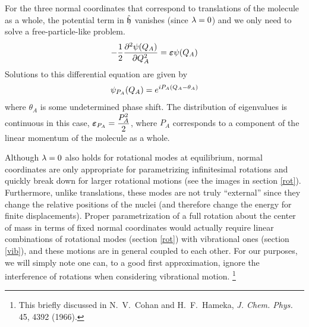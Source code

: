 \documentclass[11pt]{article}
\begin{document}
For the three normal coordinates that correspond to translations of the molecule as a whole, the potential term in $\hat{\mathfrak{h}}$ vanishes (since $\lambda=0$) and we only need to solve a free-particle-like problem.
\begin{align}
-\dfrac{1}{2}
	 \dfrac{ \partial^{2} \psi(Q_A) }{\partial Q_A ^{2}}
=
	\bm\varepsilon
	\psi(Q_A)
\end{align}
Solutions to this differential equation are given by
\begin{align}
	\psi_{P_A}(Q_A)
=
	e^{iP_A(Q_A-\theta_A)}
\end{align}
where $\theta_A$ is some undetermined phase shift.
The distribution of eigenvalues is continuous in this case, $\bm\varepsilon_{P_A}=\dfrac{P_A^2}{2}$, where $P_A$ corresponds to a component of the linear momentum of the molecule as a whole.

Although $\lambda=0$ also holds for rotational modes at equilibrium, normal coordinates are only appropriate for parametrizing infinitesimal rotations and quickly break down for larger rotational motions (see the images in section \ref{rot}).
Furthermore, unlike translations, these modes are not truly ``external'' since they change the relative positions of the nuclei (and therefore change the energy for finite displacements).
Proper parametrization of a full rotation about the center of mass in terms of fixed normal coordinates would actually require linear combinations of rotational modes (section \ref{rot}) with vibrational ones (section \ref{vib}), and these motions are in general coupled to each other.
For our purposes, we will simply note one can, to a good first approximation, ignore the interference of rotations when considering vibrational motion. \footnote{This briefly discussed in N.\ V.\ Cohan and H.\ F.\ Hameka, {\it J. Chem. Phys.} 45, 4392 (1966).}
\end{document}
